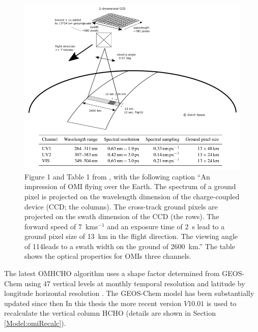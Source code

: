   \begin{figure}
    \includegraphics[width=\textwidth]{Figures/Shenkeveld_OMI_summary.png}
    \caption{ %
      Figure 1 and Table 1 from \textcite{Schenkeveld2017}, with the following caption ``An impression of OMI flying over the Earth.
      The spectrum of a ground pixel is projected on the wavelength dimension of the charge-coupled device (CCD; the columns). 
      The cross-track ground pixels are projected on the swath dimension of the CCD (the rows).
      The forward speed of 7~kms$^{-1}$ and an exposure time of 2~s lead to a ground pixel size of 13~km in the flight direction.
      The viewing angle of 114\degr leads to a swath width on the ground of 2600~km.''
      The table shows the optical properties for OMIs three channels.}
    \label{LR:HCHO:Sat:fig_Shenkeveld_OMI_summary}
  \end{figure}
  
  The latest OMHCHO algorithm uses a shape factor determined from GEOS-Chem using 47 vertical levels at monthly temporal resolution and \lowhr latitude by longitude horizontal resolution \parencite{Abad2015}.
  The GEOS-Chem model has been substantially updated since then
  In this thesis the more recent version $V10.01$ is used to recalculate the vertical column HCHO (details are shown in Section \ref{Model:omiRecalc}).
  
